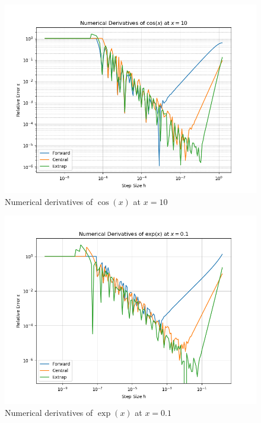 \documentclass[11pt]{article}
\theoremstyle{theorem}
\theoremstyle{definition}
\theoremstyle{remark}
\begin{document}
\begin{enumerate}
\begin{enumerate}
    \begin{figure}[H]
        \centering
        \includegraphics[scale=0.65]{derivative2.png}
        \caption{Numerical derivatives of $\cos(x)$ at $x=10$}
        \label{fig:my_label}
    \end{figure}
    
    \begin{figure}[H]
        \centering
        \includegraphics[scale=0.65]{derivative3.png}
        \caption{Numerical derivatives of $\exp(x)$ at $x=0.1$}
        \label{fig:my_label}
    \end{figure}
    

\end{enumerate}
\end{enumerate}
\end{document}
